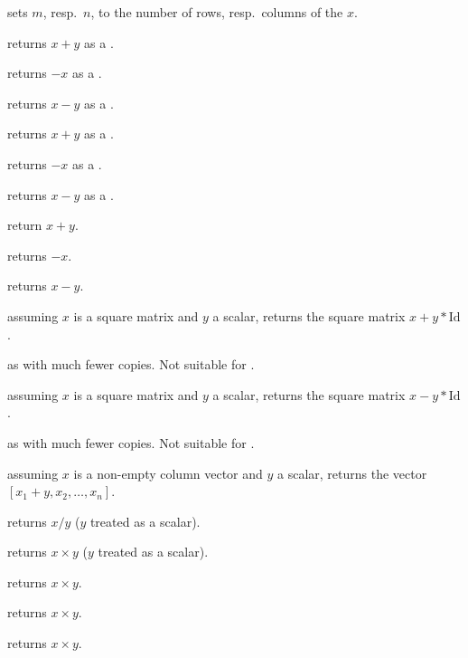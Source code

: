  sets $m$, resp.~$n$, to
the number of rows, resp.~columns of the  $x$.

 returns $x + y$ as a .

 returns $-x$ as a .

 returns $x - y$ as a .

 returns $x + y$ as a .

 returns $-x$ as a .

 returns $x - y$ as a .

 return $x+y$.

 returns $-x$.

 returns $x-y$.

 assuming $x$ is a square matrix
and $y$ a scalar, returns the square matrix $x + y*\text{Id}$.

 as  with much
fewer copies. Not suitable for .

 assuming $x$ is a square matrix
and $y$ a scalar, returns the square matrix $x - y*\text{Id}$.

 as  with much
fewer copies. Not suitable for .

 assuming $x$ is a non-empty column vector
and $y$ a scalar, returns the vector $[x_1 + y, x_2,\dots,x_n]$.


 returns $x/y$ ($y$ treated as a scalar).



 returns $x\times y$ ($y$ treated as a
scalar).

 returns $x\times y$.

 returns $x\times y$.

 returns $x\times y$.

